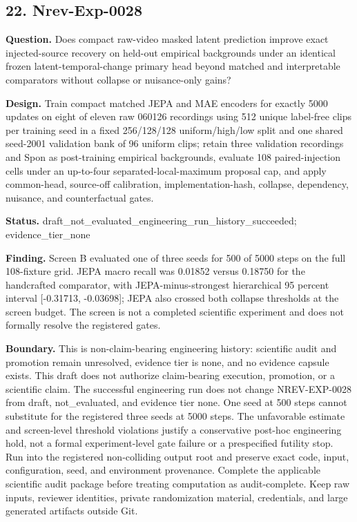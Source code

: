\subsection{22. Nrev-Exp-0028}

\textbf{Question.} Does compact raw-video masked latent prediction improve exact injected-source recovery on held-out empirical backgrounds under an identical frozen latent-temporal-change primary head beyond matched and interpretable comparators without collapse or nuisance-only gains?

\textbf{Design.} Train compact matched JEPA and MAE encoders for exactly 5000 updates on eight of eleven raw 060126 recordings using 512 unique label-free clips per training seed in a fixed 256/128/128 uniform/high/low split and one shared seed-2001 validation bank of 96 uniform clips; retain three validation recordings and Spon as post-training empirical backgrounds, evaluate 108 paired-injection cells under an up-to-four separated-local-maximum proposal cap, and apply common-head, source-off calibration, implementation-hash, collapse, dependency, nuisance, and counterfactual gates.

\textbf{Status.} draft\_not\_evaluated\_engineering\_run\_history\_succeeded; evidence\_tier\_none

\textbf{Finding.} Screen B evaluated one of three seeds for 500 of 5000 steps on the full 108-fixture grid. JEPA macro recall was 0.01852 versus 0.18750 for the handcrafted comparator, with JEPA-minus-strongest hierarchical 95 percent interval [-0.31713, -0.03698]; JEPA also crossed both collapse thresholds at the screen budget. The screen is not a completed scientific experiment and does not formally resolve the registered gates.

\textbf{Boundary.} This is non-claim-bearing engineering history: scientific audit and promotion remain unresolved, evidence tier is none, and no evidence capsule exists. This draft does not authorize claim-bearing execution, promotion, or a scientific claim. The successful engineering run does not change NREV-EXP-0028 from draft, not\_evaluated, and evidence tier none. One seed at 500 steps cannot substitute for the registered three seeds at 5000 steps. The unfavorable estimate and screen-level threshold violations justify a conservative post-hoc engineering hold, not a formal experiment-level gate failure or a prespecified futility stop. Run into the registered non-colliding output root and preserve exact code, input, configuration, seed, and environment provenance. Complete the applicable scientific audit package before treating computation as audit-complete. Keep raw inputs, reviewer identities, private randomization material, credentials, and large generated artifacts outside Git.

